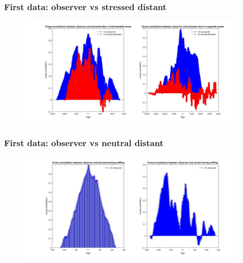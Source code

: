 \documentclass{beamer}
\begin{document}
\begin{frame}
\frametitle{First data: observer vs stressed distant }





\begin{figure}[H]
	\begin{center}
		\hspace*{-1cm}
		\includegraphics[scale=.30]{obs_stress_distant.jpg} 
	\end{center}  
	
	
\end{figure}


\end{frame}	


\begin{frame}
\frametitle{First data:  observer vs neutral distant}





\begin{figure}[H]
	\begin{center}
		\hspace*{-1cm}
		\includegraphics[scale=.30]{sniff_corr.jpg} 
	\end{center}  
	
	
\end{figure}


\end{frame}	
\end{document}
